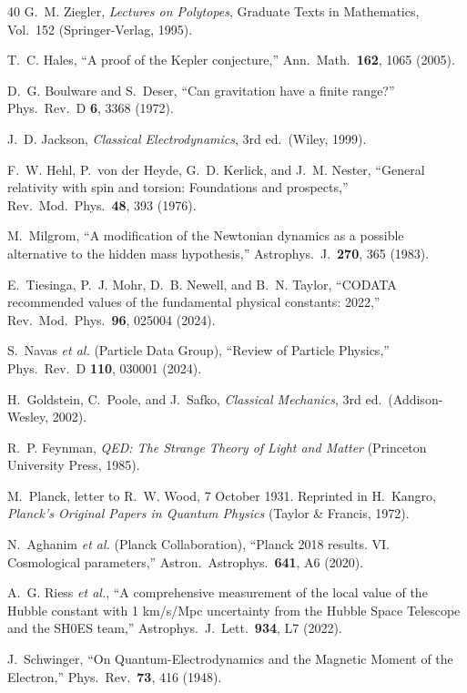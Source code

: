 \documentclass[aps,prd,preprint,superscriptaddress,showpacs,preprintnumbers,amsmath,amssymb,nofootinbib]{revtex4-2}
\begin{document}
\begin{thebibliography}{40}
G.~M. Ziegler, \emph{Lectures on Polytopes}, Graduate Texts in Mathematics, Vol.~152 (Springer-Verlag, 1995).

T.~C. Hales, ``A proof of the Kepler conjecture,'' Ann.\ Math.\ \textbf{162}, 1065 (2005).

D.~G. Boulware and S.~Deser, ``Can gravitation have a finite range?'' Phys.\ Rev.\ D \textbf{6}, 3368 (1972).

J.~D. Jackson, \emph{Classical Electrodynamics}, 3rd ed.\ (Wiley, 1999).

F.~W. Hehl, P.~von der Heyde, G.~D. Kerlick, and J.~M. Nester, ``General relativity with spin and torsion: Foundations and prospects,'' Rev.\ Mod.\ Phys.\ \textbf{48}, 393 (1976).

M.~Milgrom, ``A modification of the Newtonian dynamics as a possible alternative to the hidden mass hypothesis,'' Astrophys.\ J.\ \textbf{270}, 365 (1983).

E.~Tiesinga, P.~J. Mohr, D.~B. Newell, and B.~N. Taylor, ``CODATA recommended values of the fundamental physical constants: 2022,'' Rev.\ Mod.\ Phys.\ \textbf{96}, 025004 (2024).

S.~Navas \textit{et al.} (Particle Data Group), ``Review of Particle Physics,'' Phys.\ Rev.\ D \textbf{110}, 030001 (2024).

H.~Goldstein, C.~Poole, and J.~Safko, \emph{Classical Mechanics}, 3rd ed.\ (Addison-Wesley, 2002).

R.~P. Feynman, \emph{QED: The Strange Theory of Light and Matter} (Princeton University Press, 1985).

M.~Planck, letter to R.~W. Wood, 7 October 1931. Reprinted in H.~Kangro, \emph{Planck's Original Papers in Quantum Physics} (Taylor \& Francis, 1972).

N.~Aghanim \textit{et al.} (Planck Collaboration), ``Planck 2018 results. VI. Cosmological parameters,'' Astron.\ Astrophys.\ \textbf{641}, A6 (2020).

A.~G. Riess \textit{et al.}, ``A comprehensive measurement of the local value of the Hubble constant with 1 km/s/Mpc uncertainty from the Hubble Space Telescope and the SH0ES team,'' Astrophys.\ J.\ Lett.\ \textbf{934}, L7 (2022).

J.~Schwinger, ``On Quantum-Electrodynamics and the Magnetic Moment of the Electron,'' Phys.\ Rev.\ \textbf{73}, 416 (1948).


\end{thebibliography}
\end{document}
